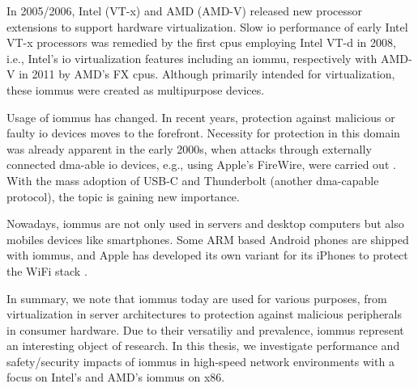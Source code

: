 In 2005/2006, Intel (VT-x) and AMD (AMD-V) released new processor extensions to
support hardware virtualization. Slow \ac{io} performance of early Intel VT-x
processors \cite{adams2006comparison} was remedied by the first \acp{cpu}
employing Intel VT-d in 2008, i.e., Intel's \ac{io} virtualization features
including an \ac{iommu}, respectively with AMD-V in 2011 by AMD's FX \acp{cpu}.
Although primarily intended for virtualization, these \acp{iommu} were created
as multipurpose devices.

Usage of \acp{iommu} has changed. In recent years, protection against malicious
or faulty \ac{io} devices moves to the forefront. Necessity for protection in
this domain was already apparent in the early 2000s, when attacks through
externally connected \ac{dma}-able \ac{io} devices, e.g., using Apple's
FireWire, were carried out \cite{becher2005firewire}. With the mass adoption of
USB-C and Thunderbolt (another \ac{dma}-capable protocol), the topic is gaining
new importance.

Nowadays, \acp{iommu} are not only used in servers and desktop computers but
also mobiles devices like smartphones. Some ARM based Android phones are shipped
with \acp{iommu}, and Apple has developed its own variant for its iPhones to
protect the WiFi stack \cite{beniamini2017overtheair}.

In summary, we note that \acp{iommu} today are used for various purposes, from
virtualization in server architectures to protection against malicious
peripherals in consumer hardware. Due to their versatiliy and prevalence,
\acp{iommu} represent an interesting object of research. In this thesis, we
investigate performance and safety/security impacts of \acp{iommu} in high-speed
network environments with a focus on Intel's and AMD's \acp{iommu} on x86.

